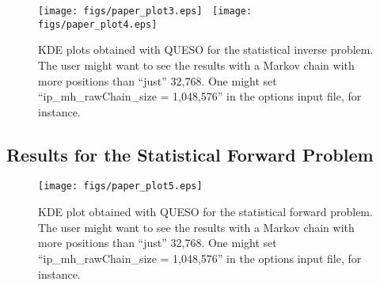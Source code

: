 \begin{figure}[h!]
\centerline{
\texttt{[image: figs/paper\_plot3.eps]}
$~$
\texttt{[image: figs/paper\_plot4.eps]}
}
\caption{
KDE plots obtained with QUESO for the statistical inverse problem.
The user might want to see the results with a Markov chain with more positions than ``just'' 32,768. One might set ``ip\_mh\_rawChain\_size = 1,048,576'' in the options input file, for instance.
}
\label{fig-sip-hist-kde-plots}
\end{figure}


\clearpage

\subsection{Results for the Statistical Forward Problem}

\begin{figure}[h!]
\centerline{
\texttt{[image: figs/paper\_plot5.eps]}
}
\caption{
KDE plot obtained with QUESO for the statistical forward problem.
The user might want to see the results with a Markov chain with more positions than ``just'' 32,768. One might set ``ip\_mh\_rawChain\_size = 1,048,576'' in the options input file, for instance.
}
\label{fig-sfp-hist-kde-plots}
\end{figure}


